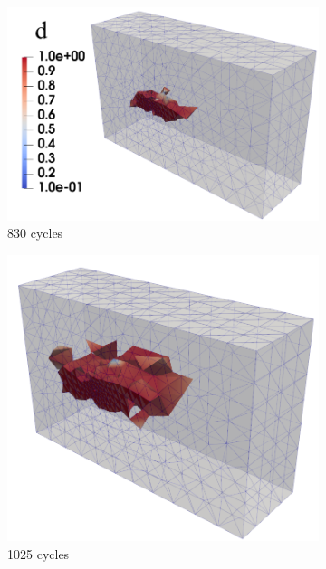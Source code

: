 \documentclass[11pt,a4paper]{article}
\begin{document}
\begin{figure} [ht]
\begin{subfigure}{0.335\textwidth}
\includegraphics[scale=0.34]{6.25.png}
\caption{830 cycles}
\end{subfigure}
\begin{subfigure}{0.34\textwidth}
\includegraphics[scale=0.26, center]{8.25.png}
\caption{1025 cycles}
\end{subfigure}
\begin{subfigure}{0.27\textwidth}

\end{subfigure}
\end{figure}
\end{document}
